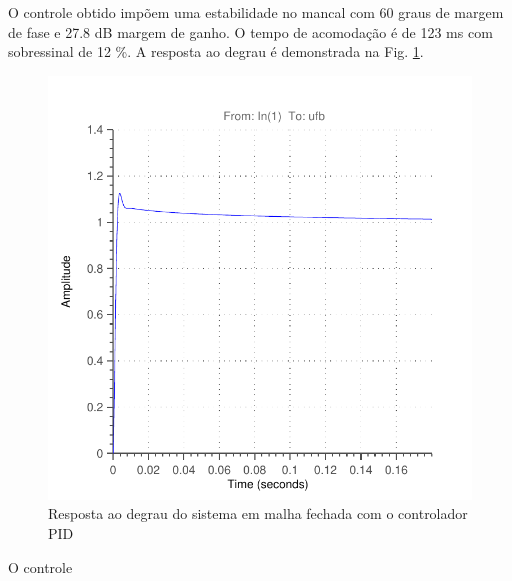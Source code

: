 O controle obtido impõem uma estabilidade no mancal com 60 graus de margem de fase e 27.8 dB margem de ganho. O tempo de acomodação é de 123 ms com sobressinal de 12 \%. A resposta ao degrau é demonstrada na Fig. \ref{fig:controle:degrau}.

\begin{figure}[ht!]
\centering
\includegraphics[width=0.7\linewidth]{Figs/controle/step_pid_g}
\caption{Resposta ao degrau do sistema em malha fechada com o controlador PID}
\label{fig:controle:degrau}
\end{figure}

O controle 
